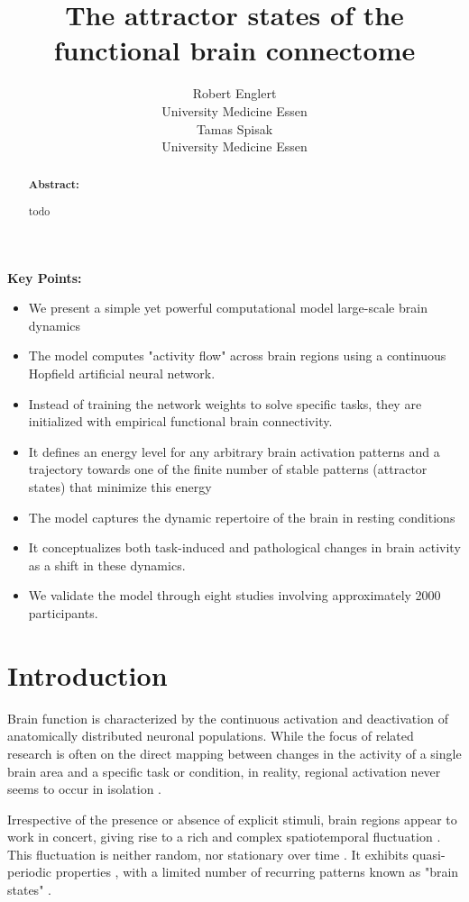 \documentclass{article}
\title{The attractor states of the functional brain connectome}
\date{\displaydate{articleDate}}
\author{Robert Englert\\
University Medicine Essen\\\AND
Tamas Spisak\footnotemark[1]\\
University Medicine Essen\\}
\begin{document}
\maketitle
{}

\begin{abstract}
\textbf{Abstract:}

todo
\end{abstract}

\keywords{}

\textbf{Key Points:}

\begin{itemize}
\item We present a simple yet powerful computational model large-scale brain dynamics
\item The model computes "activity flow" across brain regions using a continuous Hopfield artificial neural network.
\item Instead of training the network weights to solve specific tasks, they are initialized with empirical functional brain
connectivity.
\item It defines an energy level for any arbitrary brain activation patterns and a trajectory towards one of the finite
number of stable patterns (attractor states) that minimize this energy
\item The model captures the dynamic repertoire of the brain in resting conditions
\item It conceptualizes both task-induced and pathological changes in brain activity as a shift in these dynamics.
\item We validate the model through eight studies involving approximately 2000 participants.
\end{itemize}

\section{Introduction}\label{Introduction}

Brain function is characterized by the continuous activation and deactivation of anatomically distributed neuronal
populations.
While the focus of related research is often on the direct mapping between changes in the activity of a single brain
area and a specific task or condition, in reality, regional activation never seems to occur in isolation
\citep{bassett2017network}.

Irrespective of the presence or absence of explicit stimuli, brain regions appear to work in concert, giving rise to a
rich and complex spatiotemporal fluctuation \citep{gutierrez2019infraslow}.
This fluctuation is neither random, nor stationary over time \citep{liu2013time, zalesky2014time}.
It exhibits quasi-periodic properties \citep{thompson2014quasi}, with a limited number of
recurring patterns known as "brain states" \citep{greene2023everyone, vidaurre2017brain, liu2013time, richiardi2011decoding}.
\end{document}
